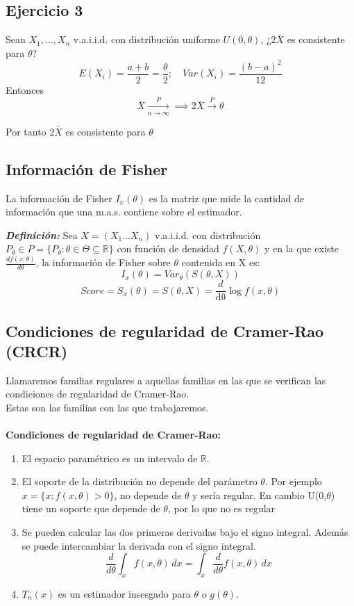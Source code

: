 \subsection*{Ejercicio 3}
Sean $X_1, \dots, X_n$ v.a.i.i.d. con distribución uniforme $U(0,\theta)$, ¿$2 \bar{X}$ es consistente para $\theta$?
\[
    E(X_i)=\frac{a+b}{2}=\frac{\theta}{2};\quad Var(X_i)=\frac{(b-a)^2}{12}
\]
Entonces
\[
    \bar{X} \xrightarrow[n \to \infty]{P} \implies 2 \bar{X} \xrightarrow{P} \theta
\]

Por tanto $2 \bar{X}$ es consistente para $\theta$

\newpage

\subsection{Información de Fisher}

La información de Fisher $I_x(\theta)$ es la matriz que mide la cantidad
de información que una m.a.s. contiene sobre el estimador.

\textbf{\textit{Definición: }} Sea $X=(X_1 \dots X_n)$ v.a.i.i.d. con distribución $P_\theta \in P=\{P_\theta : \theta \in \Theta \subseteq \mathbb{R}\}$ con función de densidad $f(X,\theta)$ y en la que existe $\frac{d f(x,\theta)}{d \theta}$, la información de Fisher sobre $\theta$ contenida en X es:
\[
    I_x(\theta) = Var_\theta (S(\theta,X))
\]
\[
    Score=S_x(\theta)=S(\theta,X)=\frac{d}{\mathrm{d\theta}}\log f(x,\theta)
\]
\subsection{Condiciones de regularidad de Cramer-Rao (CRCR)}

Llamaremos familias regulares a aquellas familias en las que se verifican las
condiciones de regularidad de Cramer-Rao.
\\ Estas son las familias con las que trabajaremos.
\\ \\\textbf{Condiciones de regularidad de Cramer-Rao:}
\begin{enumerate}
    \item El espacio paramétrico es un intervalo de $\mathbb{R}$.
    \item El soporte de la distribución no depende del parámetro $\theta$.
          Por ejemplo $x=\{x:f(x,\theta) > 0 \}$, no depende de $\theta$ y sería regular. En cambio U(0,$\theta$)
          tiene un soporte que depende de $\theta$, por lo que no es regular
    \item Se pueden calcular las dos primeras derivadas bajo el signo integral.
          Además se puede intercambiar la derivada con el signo integral.
          \[
              \frac{d}{d \theta} \int_{x} f(x,\theta)  \,dx = \int_{x} \frac{d}{d \theta} f(x,\theta)  \,dx
          \]
    \item $T_n(x)$ es un estimador insesgado para $\theta$ o $g(\theta)$.
\end{enumerate}

